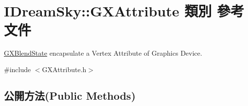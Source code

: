 \hypertarget{class_i_dream_sky_1_1_g_x_attribute}{}\section{I\+Dream\+Sky\+:\+:G\+X\+Attribute 類別 參考文件}
\label{class_i_dream_sky_1_1_g_x_attribute}


\hyperlink{class_i_dream_sky_1_1_g_x_blend_state}{G\+X\+Blend\+State} encapsulate a Vertex Attribute of Graphics Device.  




{\ttfamily \#include $<$G\+X\+Attribute.\+h$>$}

\subsection*{公開方法(Public Methods)}
